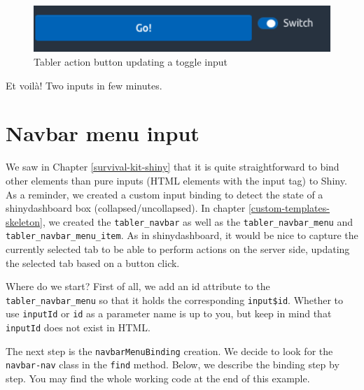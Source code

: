 \documentclass[
]{book}
\newenvironment{Shaded}{\begin{snugshade}}{\end{snugshade}}
\newcommand{\ControlFlowTok}[1]{\textcolor[rgb]{0.13,0.29,0.53}{\textbf{#1}}}
\newcommand{\DataTypeTok}[1]{\textcolor[rgb]{0.13,0.29,0.53}{#1}}
\newcommand{\KeywordTok}[1]{\textcolor[rgb]{0.13,0.29,0.53}{\textbf{#1}}}
\newcommand{\NormalTok}[1]{#1}
\newcommand{\OperatorTok}[1]{\textcolor[rgb]{0.81,0.36,0.00}{\textbf{#1}}}
\newcommand{\OtherTok}[1]{\textcolor[rgb]{0.56,0.35,0.01}{#1}}
\newcommand{\StringTok}[1]{\textcolor[rgb]{0.31,0.60,0.02}{#1}}
\begin{document}
\begin{figure}
\includegraphics[width=4.88in]{images/practice/tabler-toggle} \caption{Tabler action button updating a toggle input}\label{fig:tabler-toggle}
\end{figure}

Et voilà! Two inputs in few minutes.

\hypertarget{navbar-menu-input}{%
\section{Navbar menu input}\label{navbar-menu-input}}

We saw in Chapter \ref{survival-kit-shiny} that it is quite straightforward to bind other elements than pure inputs (HTML elements with the input tag) to Shiny. As a reminder, we created a custom input binding to detect the state of a shinydashboard box (collapsed/uncollapsed).
In chapter \ref{custom-templates-skeleton}, we created the \texttt{tabler\_navbar} as well as the \texttt{tabler\_navbar\_menu} and \texttt{tabler\_navbar\_menu\_item}. As in shinydashboard, it would be nice to capture the currently selected tab to be able to perform actions on the server side, updating the selected tab based on a button click.

Where do we start? First of all, we add an id attribute to the \texttt{tabler\_navbar\_menu} so that it holds the corresponding \texttt{input\$id}. Whether to use \texttt{inputId} or \texttt{id} as a parameter name is up to you, but keep in mind that \texttt{inputId} does not exist in HTML.

\begin{Shaded}
\end{Shaded}

The next step is the \texttt{navbarMenuBinding} creation. We decide to look for the \texttt{navbar-nav} class in the \texttt{find} method. Below, we describe the binding step by step. You may find the whole working code at the end of this example.
\end{document}
